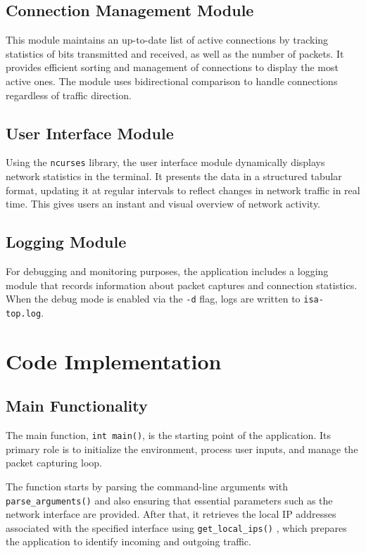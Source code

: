 \documentclass[12pt]{extarticle}
\begin{document}
\subsection{Connection Management Module}

This module maintains an up-to-date list of active connections by tracking statistics of bits transmitted and received, as well as the number of packets. It provides efficient sorting and management of connections to display the most active ones. The module uses bidirectional comparison to handle connections regardless of traffic direction.

\subsection{User Interface Module}

Using the \texttt{ncurses} library, the user interface module dynamically displays network statistics in the terminal. It presents the data in a structured tabular format, updating it at regular intervals to reflect changes in network traffic in real time. This gives users an instant and visual overview of network activity.

\subsection{Logging Module}

For debugging and monitoring purposes, the application includes a logging module that records  information about packet captures and connection statistics. When the debug mode is enabled via the \texttt{-d} flag, logs are written to \texttt{isa-top.log}.
\section{Code Implementation}

\subsection{Main Functionality}

The main function, \texttt{int main()}, is the starting point of the application. Its primary role is to initialize the environment, process user inputs, and manage the packet capturing loop.

The function starts by parsing the command-line arguments with \texttt{parse\_arguments()} \cite{beej} and also ensuring that essential parameters such as the network interface are provided. After that, it retrieves the local IP addresses associated with the specified interface using \texttt{get\_local\_ips()} \cite{linuxman}, which prepares the application to identify incoming and outgoing traffic.
\end{document}
